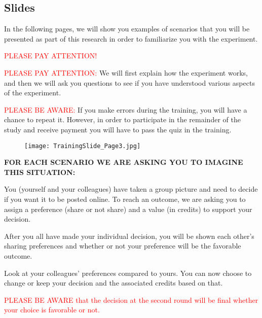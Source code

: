 \subsection{Slides}


In the following pages, we will show you examples of scenarios that you will be presented as part of this research in order to familiarize you with the experiment.

\textcolor{red}{PLEASE PAY ATTENTION!}

\vspace{5mm}

\textcolor{red}{PLEASE PAY ATTENTION:} We will first explain how the experiment works, and then we will ask you questions to see if you have understood various aspects of the experiment.

\textcolor{red}{PLEASE BE AWARE:} If you make errors during the training, you will have a chance to repeat it. However, in order to participate in the remainder of the study and receive payment you will have to pass the quiz in the training.


\vspace{5mm}
\begin{figure}[H]    \texttt{[image: TrainingSlide\_Page3.jpg]}
    \label{fig:ts_page3}
\end{figure}

\clearpage
{}

\textbf{FOR EACH SCENARIO WE ARE ASKING YOU TO IMAGINE THIS SITUATION:}

You (yourself and your colleagues) have taken a group picture and need to decide if you want it to be posted online. To reach an outcome, we are asking you to assign a preference (share or not share) and a value (in credits) to support your decision. 

After you all have made your individual decision, you will be shown each other’s sharing preferences and whether or not your preference will be the favorable outcome.

Look at your colleagues’ preferences compared to yours. You can now choose to change or keep your decision and the associated credits based on that.

\textcolor{red}{PLEASE BE AWARE that the decision at the second round will be final whether your choice is favorable or not.}


